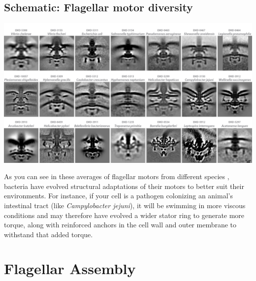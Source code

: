 \documentclass[]{tufte-book}
\begin{document}
\hypertarget{Flagellar_motor_diversity}{\subsection*{Schematic:
Flagellar motor diversity}\label{Flagellar_motor_diversity}}

\includegraphics{img/schematics/6_2_1}

As you can see in these averages of flagellar motors from different
species \citep{murphy2006} \citep{chen2011} \citep{zhao2014}
\citep{beeby2016} \citep{qin2017} \citep{chaban2018} \citep{kaplan2019}
\citep{ferreira2019} \citep{chang2019}, bacteria have evolved structural
adaptations of their motors to better suit their environments. For
instance, if your cell is a pathogen colonizing an animal's intestinal
tract (like \emph{Campylobacter jejuni}), it will be swimming in more
viscous conditions and may therefore have evolved a wider stator ring to
generate more torque, along with reinforced anchors in the cell wall and
outer membrane to withstand that added torque.

\section{Flagellar Assembly}\label{flagellar-assembly}
\end{document}
